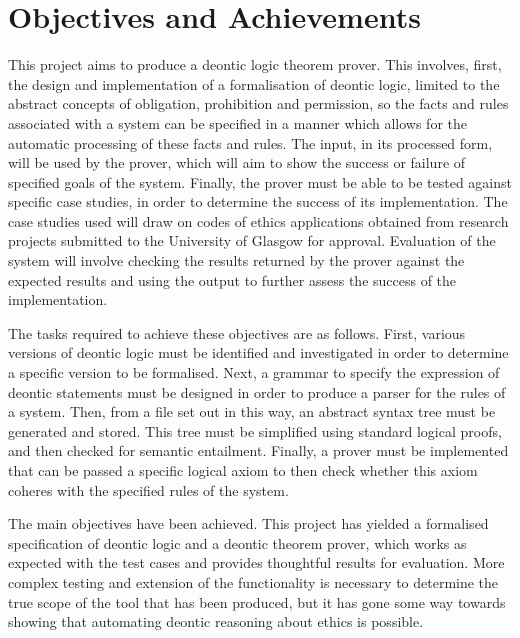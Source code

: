 \documentclass{l4proj}
\begin{document}
\section{Objectives and Achievements} 
This project aims to produce a deontic logic theorem prover. This involves, first, the design and implementation of a formalisation of deontic logic, limited to the abstract concepts of obligation, prohibition and permission, so the facts and rules associated with a system can be specified in a manner which allows for the automatic processing of these facts and rules. The input, in its processed form, will be used by the prover, which will aim to show the success or failure of specified goals of the system. Finally, the prover must be able to be tested against specific case studies, in order to determine the success of its implementation. The case studies used will draw on codes of ethics applications obtained from research projects submitted to the University of Glasgow for approval. Evaluation of the system will involve checking the results returned by the prover against the expected results and using the output to further assess the success of the implementation. 

The tasks required to achieve these objectives are as follows. First, various versions of deontic logic must be identified and investigated in order to determine a specific version to be formalised. Next, a grammar to specify the expression of deontic statements must be designed in order to produce a parser for the rules of a system. Then, from a file set out in this way, an abstract syntax tree must be generated and stored. This tree must be simplified using standard logical proofs, and then checked for semantic entailment. Finally, a prover must be implemented that can be passed a specific logical axiom to then check whether this axiom coheres with the specified rules of the system.

The main objectives have been achieved. This project has yielded a formalised specification of deontic logic and a deontic theorem prover, which works as expected with the test cases and provides thoughtful results for evaluation. More complex testing and extension of the functionality is necessary to determine the true scope of the tool that has been produced, but it has gone some way towards showing that automating deontic reasoning about ethics is possible. 
\end{document}
